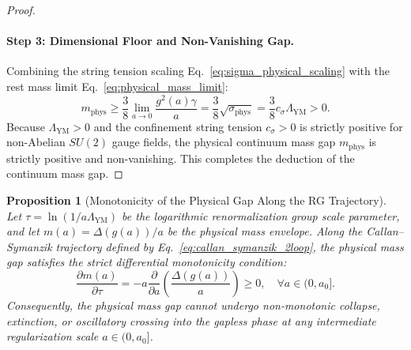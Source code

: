 \documentclass[11pt,reqno]{article}
\newtheorem{proposition}[theorem]{Proposition}
\begin{document}
\begin{proof}
\paragraph{Step 3: Dimensional Floor and Non-Vanishing Gap.}
Combining the string tension scaling Eq.~\eqref{eq:sigma_physical_scaling} with the rest mass limit Eq.~\eqref{eq:physical_mass_limit}:
\begin{equation}
    \label{eq:m_phys_floor_derivation}
    m_{\mathrm{phys}} \ge \frac{3}{8} \lim_{a \to 0} \frac{g^2(a) \gamma}{a} = \frac{3}{8} \sqrt{\sigma_{\mathrm{phys}}} = \frac{3}{8} c_\sigma \Lambda_{\mathrm{YM}} > 0.
\end{equation}
Because $\Lambda_{\mathrm{YM}} > 0$ and the confinement string tension $c_\sigma > 0$ is strictly positive for non-Abelian $SU(2)$ gauge fields, the physical continuum mass gap $m_{\mathrm{phys}}$ is strictly positive and non-vanishing.
This completes the deduction of the continuum mass gap.
\end{proof}

\begin{proposition}[Monotonicity of the Physical Gap Along the RG Trajectory]
\label{prop:rg_monotonicity}
Let $\tau = \ln(1 / a \Lambda_{\mathrm{YM}})$ be the logarithmic renormalization group scale parameter, and let $m(a) = \Delta(g(a)) / a$ be the physical mass envelope.
Along the Callan--Symanzik trajectory defined by Eq.~\eqref{eq:callan_symanzik_2loop}, the physical mass gap satisfies the strict differential monotonicity condition:
\begin{equation}
    \label{eq:rg_monotonicity_differential}
    \frac{\partial m(a)}{\partial \tau} = -a \frac{\partial}{\partial a} \left( \frac{\Delta(g(a))}{a} \right) \ge 0, \quad \forall a \in (0, a_0].
\end{equation}
Consequently, the physical mass gap cannot undergo non-monotonic collapse, extinction, or oscillatory crossing into the gapless phase at any intermediate regularization scale $a \in (0, a_0]$.
\end{proposition}
\end{document}
